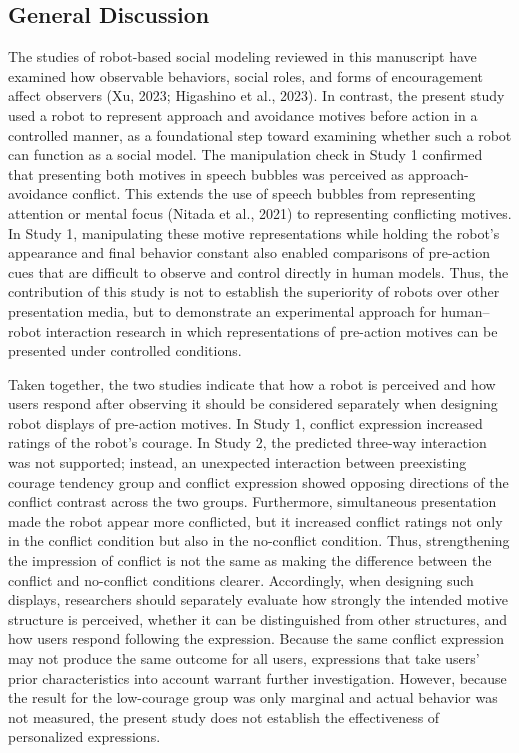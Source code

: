 \documentclass[
]{article}
\begin{document}
\subsection{General Discussion}\label{general-discussion}

The studies of robot-based social modeling reviewed in this manuscript
have examined how observable behaviors, social roles, and forms of
encouragement affect observers (Xu, 2023; Higashino et al., 2023). In
contrast, the present study used a robot to represent approach and
avoidance motives before action in a controlled manner, as a
foundational step toward examining whether such a robot can function as
a social model. The manipulation check in Study 1 confirmed that
presenting both motives in speech bubbles was perceived as
approach-avoidance conflict. This extends the use of speech bubbles from
representing attention or mental focus (Nitada et al., 2021) to
representing conflicting motives. In Study 1, manipulating these motive
representations while holding the robot's appearance and final behavior
constant also enabled comparisons of pre-action cues that are difficult
to observe and control directly in human models. Thus, the contribution
of this study is not to establish the superiority of robots over other
presentation media, but to demonstrate an experimental approach for
human--robot interaction research in which representations of pre-action
motives can be presented under controlled conditions.

Taken together, the two studies indicate that how a robot is perceived
and how users respond after observing it should be considered separately
when designing robot displays of pre-action motives. In Study 1,
conflict expression increased ratings of the robot's courage. In Study
2, the predicted three-way interaction was not supported; instead, an
unexpected interaction between preexisting courage tendency group and
conflict expression showed opposing directions of the conflict contrast
across the two groups. Furthermore, simultaneous presentation made the
robot appear more conflicted, but it increased conflict ratings not only
in the conflict condition but also in the no-conflict condition. Thus,
strengthening the impression of conflict is not the same as making the
difference between the conflict and no-conflict conditions clearer.
Accordingly, when designing such displays, researchers should separately
evaluate how strongly the intended motive structure is perceived,
whether it can be distinguished from other structures, and how users
respond following the expression. Because the same conflict expression
may not produce the same outcome for all users, expressions that take
users' prior characteristics into account warrant further investigation.
However, because the result for the low-courage group was only marginal
and actual behavior was not measured, the present study does not
establish the effectiveness of personalized expressions.
\end{document}
